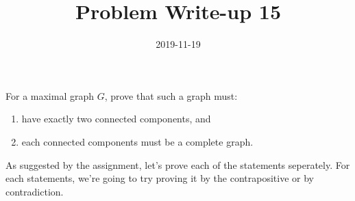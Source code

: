 \documentclass[a4paper,12pt]{article}
\title{Problem Write-up 15}
\date{2019-11-19}
\begin{document}
    \begin{problem}
        For a maximal graph \(G\), prove that such a graph must:
        \begin{enumerate}[1.]
            \item have exactly two connected components, and
            \item each connected components must be a complete graph.
        \end{enumerate}
    \end{problem}
    
    \begin{answer}
        As suggested by the assignment, let's prove each of the statements seperately. For each statements, we're going to try proving it by the contrapositive or by contradiction.
    \end{answer}
\end{document}
